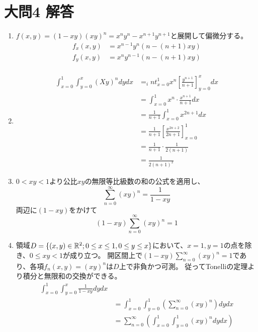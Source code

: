 \documentclass[dvipdfmx]{jsreport}
\begin{document}
\section{大問4 解答}
\begin{souanswer} %
\begin{enumerate}
    \item $f(x, y)= (1- xy)(xy)^n= x^ny^n- x^{n+ 1}y^{n+ 1}$と展開して偏微分する。
\begin{align*}
    f_x(x, y)&= x^{n- 1}y^n(n- (n+ 1)xy)\\
    f_y(x, y)&= x^ny^{n- 1}(n- (n+ 1)xy)\\
\end{align*}
    \item \label{result:R8_2nd_4(2)}
\begin{align*}
    \int_{x= 0}^1\int_{y= 0}^x (Xy)^ndydx
    &= _int_{x= 0}^1 x^n\left[\frac{y^{n+ 1}}{n+ 1}\right]_{y= 0}^xdx\\
    &= \int_{x= 0}^1 x^n\cdot \frac{x^{n+ 1}}{n+ 1}dx\\
    &= \frac{1}{n+ 1}\int_{x= 0}^1 x^{2n+ 1}dx\\
    &= \frac{1}{n+ 1}\left[\frac{x^{2n+ 2}}{2n+ 1}\right]_{x= 0}^1\\
    &= \frac{1}{n+ 1}\cdot \frac{1}{2(n+ 1)}\\
    &= \frac{1}{2(n+ 1)^2}
\end{align*}
    \item $0< xy< 1$より公比$xy$の無限等比級数の和の公式を適用し、
\begin{equation*}
    \sum_{n= 0}^\infty (xy)^n= \frac{1}{1- xy}
\end{equation*}
    両辺に$(1- xy)$をかけて
\begin{equation*}
    (1- xy)\sum_{n= 0}^\infty (xy)^n= 1
\end{equation*}
    \item 領域$D= \{(x, y)\in \mathbb{R}^2; 0\le x\le 1, 0\le y\le x\}$において、$x= 1, y= 1$の点を除き、$0\le xy< 1$が成り立つ。
    開区間上で$(1- xy)\sum_{n= 0}^\infty (xy)^n= 1$であり、各項$f_n(x, y)= (xy)^n$は$D$上で非負かつ可測。
    従ってTonelliの定理より積分と無限和の交換ができる。
\begin{align*}
    \int_{x= 0}^1\int_{y= 0}^x \frac{1}{1- xy}dydx\\
    &= \int_{x= 0}^1\int_{y= 0}^1\left(\sum_{n= 0}^\infty (xy)^n\right)dydx\\
    &= \sum_{n= 0}^\infty\left(\int_{x= 0}^1\int_{y= 0}^1 (xy)^ndydx\right)\\

\end{align*}
\end{enumerate}
\end{souanswer}
\end{document}
